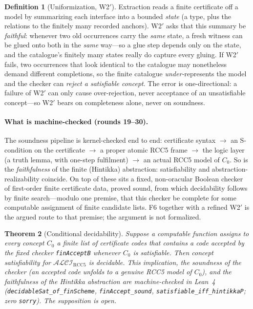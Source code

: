 \documentclass[11pt]{article}
\newcommand{\ALCIRCC}[1]{\mathcal{ALCI}_{\mathrm{RCC#1}}}
\newcommand{\code}[1]{\texttt{#1}}
\theoremstyle{plain}
\newtheorem{theorem}{Theorem}
\theoremstyle{definition}
\newtheorem{definition}[theorem]{Definition}
\begin{document}
\begin{definition}[Uniformization, W2$'$]\label{def:w2prime}
Extraction reads a finite certificate off a model by summarizing each
interface into a bounded \emph{state} (a type, plus the relations to the
finitely many recorded anchors). W2$'$ asks that this summary be
\emph{faithful}: whenever two old occurrences carry the \emph{same} state, a
fresh witness can be glued onto both in the \emph{same} way---so a glue step
depends only on the state, and the catalogue's finitely many states really
do capture every gluing. If W2$'$ fails, two occurrences that look identical
to the catalogue may nonetheless demand different completions, so the finite
catalogue \emph{under-}represents the model and the checker can
\emph{reject a satisfiable concept}. The error is one-directional: a failure
of W2$'$ can only cause over-rejection, never acceptance of an unsatisfiable
concept---so W2$'$ bears on completeness alone, never on soundness.
\end{definition}

\paragraph{What is machine-checked (rounds 19--30).} The soundness
pipeline is kernel-checked end to end: certificate syntax $\to$ an
S-condition on the certificate $\to$ a proper atomic RCC5 frame $\to$ the
logic layer (a truth lemma, with one-step fulfilment) $\to$ an actual RCC5
model of $C_0$. So is the \emph{faithfulness} of the finite (Hintikka)
abstraction: satisfiability and abstraction-realizability coincide. On top
of these sits a fixed, non-oracular Boolean checker of first-order finite
certificate data, proved sound, from which decidability follows by finite
search---modulo one premise, that this checker be complete for some
computable assignment of finite candidate lists. F6 together with a refined
W2$'$ is the argued route to that premise; the argument is not formalized.

\begin{theorem}[Conditional decidability]\label{thm:conditional}
Suppose a computable function assigns to every concept $C_0$ a finite list
of certificate codes that contains a code accepted by the fixed checker
\code{finAcceptB} whenever $C_0$ is satisfiable. Then concept satisfiability
for $\ALCIRCC{5}$ is decidable. This implication, the soundness of the
checker (an accepted code unfolds to a genuine RCC5 model of $C_0$), and the
faithfulness of the Hintikka abstraction are \emph{machine-checked in
Lean~4} (\code{decidableSat\_of\_finScheme}, \code{finAccept\_sound},
\code{satisfiable\_iff\_hintikkaP}; zero \texttt{sorry}). The supposition is
open.
\end{theorem}
\end{document}
